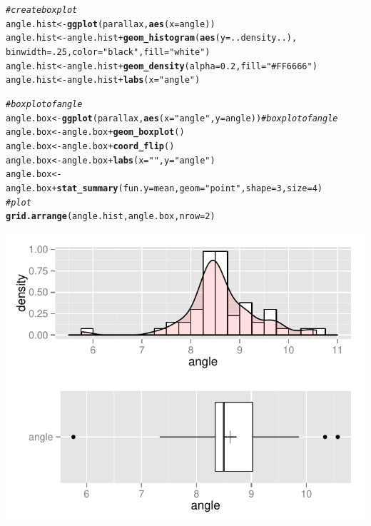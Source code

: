 \documentclass{article}\usepackage[]{graphicx}\usepackage[]{color}
\makeatletter
\def\maxwidth{ %
  \ifdim\Gin@nat@width>\linewidth
    \linewidth
  \else
    \Gin@nat@width
  \fi
}
\newcommand{\hlnum}[1]{\textcolor[rgb]{0.686,0.059,0.569}{#1}}%
\newcommand{\hlstr}[1]{\textcolor[rgb]{0.192,0.494,0.8}{#1}}%
\newcommand{\hlcom}[1]{\textcolor[rgb]{0.678,0.584,0.686}{\textit{#1}}}%
\newcommand{\hlopt}[1]{\textcolor[rgb]{0,0,0}{#1}}%
\newcommand{\hlstd}[1]{\textcolor[rgb]{0.345,0.345,0.345}{#1}}%
\newcommand{\hlkwb}[1]{\textcolor[rgb]{0.69,0.353,0.396}{#1}}%
\newcommand{\hlkwc}[1]{\textcolor[rgb]{0.333,0.667,0.333}{#1}}%
\newcommand{\hlkwd}[1]{\textcolor[rgb]{0.737,0.353,0.396}{\textbf{#1}}}%
\newenvironment{kframe}{%
 \def\at@end@of@kframe{}%
 \ifinner\ifhmode%
  \def\at@end@of@kframe{\end{minipage}}%
  \begin{minipage}{\columnwidth}%
 \fi\fi%
 \def\FrameCommand##1{\hskip\@totalleftmargin \hskip-\fboxsep
 \colorbox{shadecolor}{##1}\hskip-\fboxsep
     \hskip-\linewidth \hskip-\@totalleftmargin \hskip\columnwidth}%
 \MakeFramed {\advance\hsize-\width
   \@totalleftmargin\z@ \linewidth\hsize
   \@setminipage}}%
 {\par\unskip\endMakeFramed%
 \at@end@of@kframe}
\newenvironment{knitrout}{}{} %
\makeatother
\begin{document}
\begin{knitrout}
\color{fgcolor}\begin{kframe}
\begin{alltt}
\hlcom{#create box plot}
\hlstd{angle.hist} \hlkwb{<-} \hlkwd{ggplot}\hlstd{(parallax,} \hlkwd{aes}\hlstd{(}\hlkwc{x} \hlstd{= angle))}
\hlstd{angle.hist} \hlkwb{<-} \hlstd{angle.hist} \hlopt{+} \hlkwd{geom_histogram}\hlstd{(}\hlkwd{aes}\hlstd{(}\hlkwc{y} \hlstd{= ..density..),}
                                          \hlkwc{binwidth} \hlstd{=} \hlnum{.25}\hlstd{,}\hlkwc{color} \hlstd{=} \hlstr{"black"}\hlstd{,} \hlkwc{fill} \hlstd{=} \hlstr{"white"}\hlstd{)}
\hlstd{angle.hist} \hlkwb{<-} \hlstd{angle.hist} \hlopt{+} \hlkwd{geom_density}\hlstd{(}\hlkwc{alpha} \hlstd{=} \hlnum{0.2}\hlstd{,} \hlkwc{fill} \hlstd{=} \hlstr{"#FF6666"}\hlstd{)}
\hlstd{angle.hist} \hlkwb{<-} \hlstd{angle.hist} \hlopt{+} \hlkwd{labs}\hlstd{(}\hlkwc{x} \hlstd{=} \hlstr{"angle"}\hlstd{)}

\hlcom{# boxplot of angle}
\hlstd{angle.box} \hlkwb{<-} \hlkwd{ggplot}\hlstd{(parallax,} \hlkwd{aes}\hlstd{(}\hlkwc{x} \hlstd{=} \hlstr{"angle"}\hlstd{,} \hlkwc{y} \hlstd{= angle))} \hlcom{# boxplot of angle}
\hlstd{angle.box} \hlkwb{<-} \hlstd{angle.box} \hlopt{+} \hlkwd{geom_boxplot}\hlstd{()}
\hlstd{angle.box} \hlkwb{<-} \hlstd{angle.box} \hlopt{+} \hlkwd{coord_flip}\hlstd{()}
\hlstd{angle.box} \hlkwb{<-} \hlstd{angle.box} \hlopt{+} \hlkwd{labs}\hlstd{(}\hlkwc{x} \hlstd{=} \hlstr{""}\hlstd{,} \hlkwc{y} \hlstd{=} \hlstr{"angle"}\hlstd{)}
\hlstd{angle.box} \hlkwb{<-} \hlstd{angle.box} \hlopt{+} \hlkwd{stat_summary}\hlstd{(}\hlkwc{fun.y} \hlstd{= mean,} \hlkwc{geom} \hlstd{=} \hlstr{"point"}\hlstd{,} \hlkwc{shape} \hlstd{=} \hlnum{3}\hlstd{,} \hlkwc{size} \hlstd{=} \hlnum{4}\hlstd{)}
\hlcom{# plot}
\hlkwd{grid.arrange}\hlstd{(angle.hist, angle.box,} \hlkwc{nrow} \hlstd{=} \hlnum{2}\hlstd{)}
\end{alltt}
\end{kframe}

{\centering \includegraphics[width=\maxwidth]{figure/1_a-1} 

}



\end{knitrout}
\end{document}
